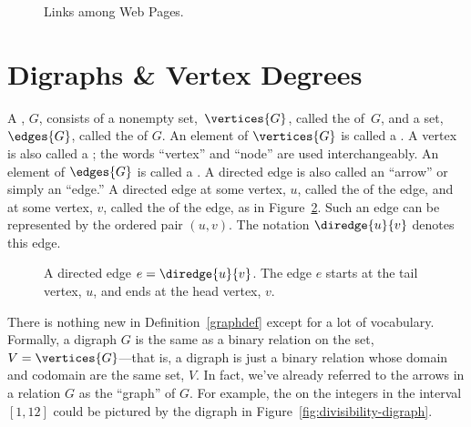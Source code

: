 \iffalse

and in the following graph the vertices $x_1, \ldots, x_n$ correspond
to web pages and $\diredge{x_i}{x_j}$ is a directed edge when page
$x_i$ contains a hyperlink to page $x_j$.
\fi


\begin{figure}


\caption{Links among Web Pages.}

\label{webpage-links}

\end{figure}

\section{Digraphs \& Vertex Degrees}

\begin{definition}\label{graphdef}
  A , $G$, consists of a nonempty
  set,~$\vertices{G}$, called the  of~$G$, and a set,
  $\edges{G}$, called the  of $G$.  An element of
  $\vertices{G}$ is called a .  A vertex is also called a
  ; the words ``vertex'' and ``node'' are used
  interchangeably.  An element of $\edges{G}$ is called a
  .  A directed edge is also called an ``arrow''
  or simply an ``edge.''  A directed edge  at some vertex, $u$, called the 
  of the edge, and  at some vertex,
  $v$, called the  of the edge, as in Figure~\ref{fig:6EA}.
  Such an edge can be represented by the ordered pair $(u,v)$.  The
  notation $\diredge{u}{v}$ denotes this edge.
\end{definition}

\begin{figure}


\caption{A directed edge $e = \diredge{u}{v}$.  The edge $e$ starts at
  the tail vertex, $u$, and ends at the head vertex, $v$.}

\label{fig:6EA}
\end{figure}

There is nothing new in Definition~\ref{graphdef} except for a lot of
vocabulary.  Formally, a digraph $G$ is the same as a binary relation
on the set, $V = \vertices{G}$---that is, a digraph is just a binary
relation whose domain and codomain are the same set, $V$.  In fact,
we've already referred to the arrows in a relation $G$ as the
``graph'' of $G$.  For example, the  on the
integers in the interval $[1,12]$ could be pictured by the digraph in
Figure~\ref{fig:divisibility-digraph}.

